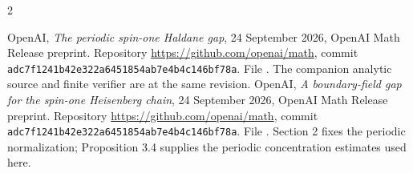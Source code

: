 \documentclass[11pt,a4paper]{article}
\newcommand{\commit}{\texttt{adc7f1241b42e322a6451854ab7e4b4c146bf78a}}
\begin{document}
\begin{thebibliography}{2}
\raggedright
{}
OpenAI, \emph{The periodic spin-one Haldane gap},
24 September 2026, OpenAI Math Release preprint.
Repository \url{https://github.com/openai/math}, commit
\commit. File
.
The companion analytic source and finite verifier are at the same revision.
OpenAI, \emph{A boundary-field gap for the spin-one Heisenberg chain},
24 September 2026, OpenAI Math Release preprint.
Repository \url{https://github.com/openai/math}, commit \commit. File
.
Section 2 fixes the periodic normalization; Proposition 3.4 supplies
the periodic concentration estimates used here.
\end{thebibliography}
\end{document}
